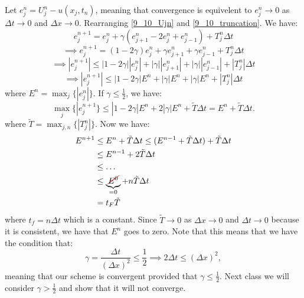 \documentclass[../main/main.tex]{subfiles}
\begin{document}
Let $e_j^n = U_j^n - u(x_j,t_n)$, meaning that convergence is equivelent to $e_j^{n} \to  0 $ as $\Delta t \to  0$ and $\Delta x \to  0$. Rearranging \ref{9_10_Ujn} and \ref{9_10_truncation}.
We have: \[
    e_j^{n+1} = e_j^n + \gamma \left( e_{j+1}^n - 2 e_j^n + e_{j-1}^n \right) + T_j^n \Delta t 
\] \[
\implies e_j^{n+1} = (1-2\gamma)e_j^n + \gamma e_{j+1}^n + \gamma e_{j-1}^n + T_j^n \Delta t
\] \[
\implies |e_j^{n+1}| \le  |1-2\gamma| |e_j^n| + |\gamma| |e_{j+1}^{n}| + |\gamma | | e_{j-1}^n| + |T^n_j| \Delta t 
\] 
\[
    \implies |e_j^{n+1}| \le 
|1-2\gamma| E^n + |\gamma| E^n + |\gamma | E^n + |T^n_j| \Delta t 
\] 
where $ E^n = \max_j \{|e_j^n|\} .$ If $\gamma\le \frac{1}{2}$, we have: \[
    \max_j \{|e^{n+1}_j\} \le  |1-2\gamma| E^{n} + 2|\gamma| E^{n} + \tilde{T} \Delta t = E^{n} + \tilde{T} \Delta t
.\] where $\tilde{T} = \max _{j, n} \{|T_j^n|\} $. Now we have:
\begin{align*}
    E^{n+1} &\le  E^n + \tilde{T} \Delta t \le  (E^{n-1} + \tilde{T} \Delta t) + \tilde{T} \Delta t   \\
            &\le  E^{n-1} + 2 \tilde{T} \Delta t \\
            &\le \ldots\\
            &\le  \underbrace{\Ccancel[red]{E^0}}_{=0} + n \tilde{T} \Delta t\\
            &= t_F\tilde{T} 
\end{align*}
where $t_f=n \Delta t$ which is a constant.
Since $\tilde{T} \to  0$ as $\Delta x\to  0$ and $\Delta t \to  0$ because it is consistent, we have that $E^{n}$ goes to zero.  Note that this means that we have the condition that: \[
    \gamma = \frac{\Delta t}{(\Delta x)^2} \le  \frac{1}{2} \implies 2\Delta t \le (\Delta x)^2
,\] meaning that our scheme is convergent provided that $\gamma \le  \frac{1}{2}$. Next class we will consider $\gamma > \frac{1}{2}$ and show that it will not converge.
\end{document}
